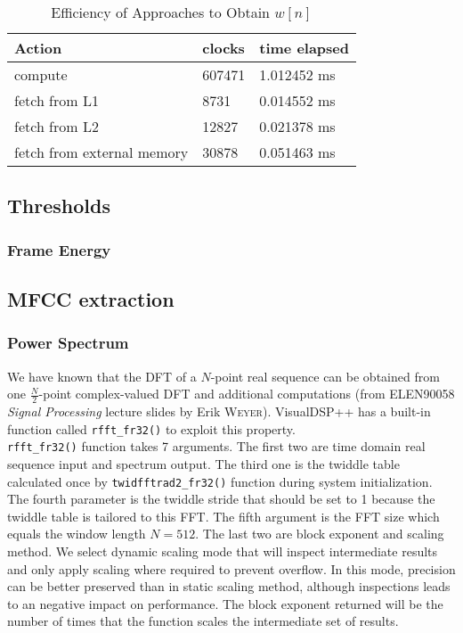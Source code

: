 \begin{table}[H]
\centering
\caption{Efficiency of Approaches to Obtain $w[n]$}
\label{clocks-hamming}
\begin{tabu} to \textwidth {XXX}
\toprule
Action &clocks &time elapsed\\
\hline
compute &607471 &1.012452 ms\\
\hline
fetch from L1 &8731 &0.014552 ms\\
\hline
fetch from L2 &12827 &0.021378 ms\\
\hline
fetch from external memory &30878 &0.051463 ms\\
\bottomrule
\end{tabu}
\end{table}


\subsection{Thresholds}
\label{subsection:dsp-thresholds}
\subsubsection{Frame Energy}


\subsection{MFCC extraction}
\subsubsection{Power Spectrum}

We have known that the DFT of a $N$-point real sequence can be obtained from one $\frac{N}{2}$-point complex-valued DFT and additional computations (from ELEN90058 \textit{Signal Processing} lecture slides by Erik \textsc{Weyer}). VisualDSP++ has a built-in function called \texttt{rfft\_fr32()} to exploit this property.\\

\texttt{rfft\_fr32()} function takes 7 arguments. The first two are time domain real sequence input and spectrum output. The third one is the twiddle table calculated once by \texttt{twidfftrad2\_fr32()} function during system initialization. The fourth parameter is the twiddle stride that should be set to 1 because the twiddle table is tailored to this FFT. The fifth argument is the FFT size which equals the window length $N = 512$. The last two are block exponent and scaling method. We select dynamic scaling mode that will inspect intermediate results and only apply scaling where required to prevent overflow. In this mode, precision can be better preserved than in static scaling method, although inspections leads to an negative impact on performance. The block exponent returned will be the number of times that the function scales the intermediate set of results.\\

